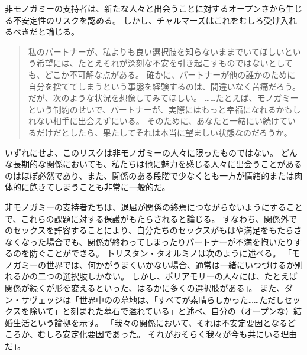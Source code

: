 \documentclass[paper=a4,book,openany]{jlreq}
\begin{document}
非モノガミーの支持者は、新たな人々と出会うことに対するオープンさから生じる不安定性のリスクを認める。
しかし、チャルマーズはこれをむしろ受け入れるべきだと論じる。

\begin{quote}
私のパートナーが、私よりも良い選択肢を知らないままでいてほしいという希望には、たとえそれが深刻な不安を引き起こすものではないとしても、どこか不可解な点がある。
確かに、パートナーが他の誰かのために自分を捨ててしまうという事態を経験するのは、間違いなく苦痛だろう。
だが、次のような状況を想像してみてほしい。
……たとえば、モノガミーという制約のせいで、パートナーが、実際にはもっと幸福になれるかもしれない相手に出会えずにいる。
そのために、あなたと一緒にい続けているだけだとしたら、果たしてそれは本当に望ましい状態なのだろうか\citep{chalmers19:_is_monog_moral_permis}。
\end{quote}

いずれにせよ、このリスクは非モノガミーの人々に限ったものではない。
どんな長期的な関係においても、私たちは他に魅力を感じる人々に出会うことがあるのはほぼ必然であり、また、関係のある段階で少なくとも一方が情緒的または肉体的に飽きてしまうことも非常に一般的だ。

非モノガミーの支持者たちは、退屈が関係の終焉につながらないようにすることで、これらの課題に対する保護がもたらされると論じる。
すなわち、関係外でのセックスを許容することにより、自分たちのセックスがもはや満足をもたらさなくなった場合でも、関係が終わってしまったりパートナーが不満を抱いたりするのを防ぐことができる。
トリスタン・タオルミノは次のように述べる。
「モノガミーの世界では、何かがうまくいかない場合、通常は一緒にいつづけるか別れるかの二つの選択肢しかない。
しかし、ポリアモリーの人々には、たとえば関係が続くが形を変えるといった、はるかに多くの選択肢がある」\citep[p.217]{taormino08:_openin_up}。
また、ダン・サヴェッジは「世界中のの墓地は、「すべてが素晴らしかった……ただしセックスを除いて」と刻まれた墓石で溢れている」と述べ、自分の（オープンな）結婚生活という論拠を示す。
「我々の関係において、それは不安定要因となるどころか、むしろ安定化要因であった。
それがおそらく我々が今も共にいる理由だ」\citep{oppenheimer11:_married_infid}。
\end{document}
